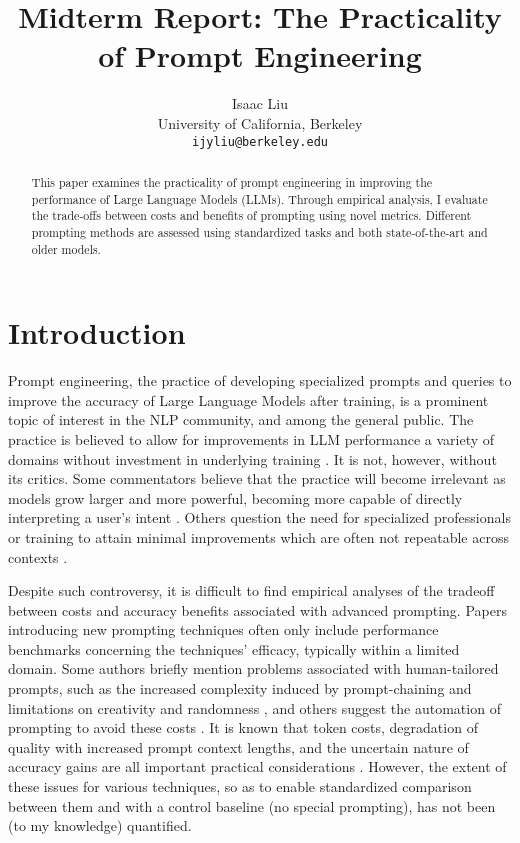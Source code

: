 \documentclass[11pt]{article}
\title{Midterm Report: The Practicality of Prompt Engineering}
\author{Isaac Liu \\
  University of California, Berkeley \\
  \texttt{ijyliu@berkeley.edu}}
\begin{document}
\maketitle
\begin{abstract}
  This paper examines the practicality of prompt engineering in improving the performance of Large Language Models (LLMs). Through empirical analysis, I evaluate the trade-offs between costs and benefits of prompting using novel metrics. Different prompting methods are assessed using standardized tasks and both state-of-the-art and older models.
\end{abstract}

\section*{Introduction}

Prompt engineering, the practice of developing specialized prompts and queries to improve the accuracy of Large Language Models after training, is a prominent topic of interest in the NLP community, and among the general public. The practice is believed to allow for improvements in LLM performance a variety of domains without investment in underlying training \cite{martineau_what_2021}. It is not, however, without its critics. Some commentators believe that the practice will become irrelevant as models grow larger and more powerful, becoming more capable of directly interpreting a user's intent \cite{ethan_mollick_emollick_i_2023}. Others question the need for specialized professionals or training to attain minimal improvements which are often not repeatable across contexts \cite{shackell_prompt_2023, acar_ai_2023}. 

Despite such controversy, it is difficult to find empirical analyses of the tradeoff between costs and accuracy benefits associated with advanced prompting. Papers introducing new prompting techniques often only include performance benchmarks concerning the techniques' efficacy, typically within a limited domain. Some authors briefly mention problems associated with human-tailored prompts, such as the increased complexity induced by prompt-chaining and limitations on creativity and randomness \cite{wu_ai_2022}, and others suggest the automation of prompting to avoid these costs \cite{diao_active_2023}. It is known that token costs, degradation of quality with increased prompt context lengths, and the uncertain nature of accuracy gains are all important practical considerations \cite{gao_prompt_2023}. However, the extent of these issues for various techniques, so as to enable standardized comparison between them and with a control baseline (no special prompting), has not been (to my knowledge) quantified.
\end{document}
